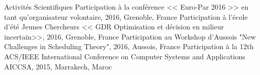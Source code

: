 \begin{rubric}{Activités Scientifiques}
\entry*[]	Participation à la conférence << Euro-Par 2016 >> en tant qu'organisateur volontaire, 2016, Grenoble, France 
\entry*[]	Participation à l'école d'été Jeunes Chercheurs << GDR Optimisation et décision en milieur incertain>>, 2016, Grenoble, France	
\entry*[]	Participation au Workshop d'Aussois "New Challenges in Scheduling Theory", 2016, Aussois, France	
\entry*[]	Participation à la 12th ACS/IEEE International Conference on Computer Systems and Applications AICCSA, 2015, Marrakech, Maroc 	
\end{rubric}
